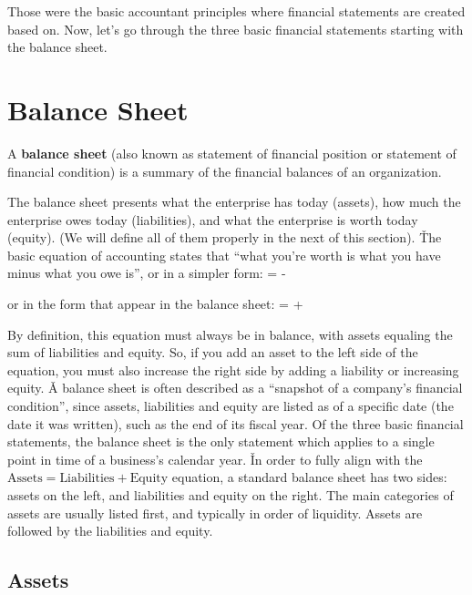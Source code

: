 Those were the basic accountant principles where financial statements are created based on. Now, let's go through the
three basic financial statements starting with the balance sheet.

\section{Balance Sheet}

A \textbf{balance sheet} (also known as statement of financial position or statement of financial condition) is a
summary of the financial balances of an organization.
\ed

The balance sheet presents what the enterprise has today (assets), how much the enterprise owes today (liabilities), and
what the enterprise is worth today (equity). (We will define all of them properly in the next of this section). \v

The basic equation of accounting states that ``what you're worth is what you have minus what you owe is'', or in a
simpler form:
\bse
{} =  - 
\ese

or in the form that appear in the balance sheet:
\bse
{} =  + 
\ese

By definition, this equation must always be in balance, with assets equaling the sum of liabilities and equity. So, if
you add an asset to the left side of the equation, you must also increase the right side by adding a liability or
increasing equity. \v

A balance sheet is often described as a ``snapshot of a company's financial condition'', since assets, liabilities
and equity are listed as of a specific date (the date it was written), such as the end of its fiscal year. Of the
three basic financial statements, the balance sheet is the only statement which applies to a single point in time of a
business's calendar year. \v

In order to fully align with the $\text{Assets} = \text{Liabilities} + \text{Equity}$ equation, a standard balance
sheet has two sides: assets on the left, and liabilities and equity on the right. The main categories of assets are
usually listed first, and typically in order of liquidity. Assets are followed by the liabilities and equity.

\subsection{Assets}

